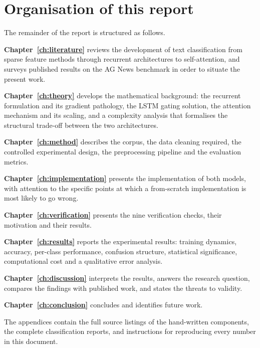 \section{Organisation of this report}

The remainder of the report is structured as follows.

\textbf{Chapter~\ref{ch:literature}} reviews the development of text classification from sparse
feature methods through recurrent architectures to self-attention, and surveys published results
on the AG News benchmark in order to situate the present work.

\textbf{Chapter~\ref{ch:theory}} develops the mathematical background: the recurrent formulation
and its gradient pathology, the LSTM gating solution, the attention mechanism and its scaling, and
a complexity analysis that formalises the structural trade-off between the two architectures.

\textbf{Chapter~\ref{ch:method}} describes the corpus, the data cleaning required, the controlled
experimental design, the preprocessing pipeline and the evaluation metrics.

\textbf{Chapter~\ref{ch:implementation}} presents the implementation of both models, with
attention to the specific points at which a from-scratch implementation is most likely to go
wrong.

\textbf{Chapter~\ref{ch:verification}} presents the nine verification checks, their motivation and
their results.

\textbf{Chapter~\ref{ch:results}} reports the experimental results: training dynamics, accuracy,
per-class performance, confusion structure, statistical significance, computational cost and a
qualitative error analysis.

\textbf{Chapter~\ref{ch:discussion}} interprets the results, answers the research question,
compares the findings with published work, and states the threats to validity.

\textbf{Chapter~\ref{ch:conclusion}} concludes and identifies future work.

The appendices contain the full source listings of the hand-written components, the complete
classification reports, and instructions for reproducing every number in this document.
